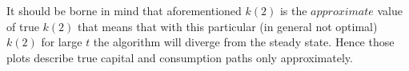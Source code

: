 \documentclass[a4paper]{article}
\begin{document}
It should be borne in mind that aforementioned $k(2)$ is the $\textit{approximate}$ value of true $k(2)$ that means that with this particular (in general not optimal) $k(2)$ for large $t$ the algorithm will diverge from the steady state. Hence those plots describe true capital and consumption paths only approximately. 
\end{document}
